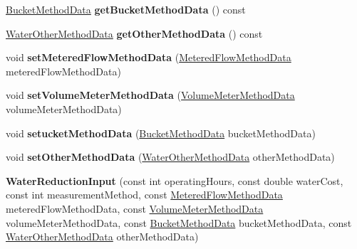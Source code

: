 \begin{DoxyCompactItemize}
\item 
\mbox{\label{class_water_reduction_input_ae327c2bd833db5da7251c605e27dd1d3}} 
\hyperlink{class_bucket_method_data}{Bucket\+Method\+Data} {\bfseries get\+Bucket\+Method\+Data} () const
\item 
\mbox{\label{class_water_reduction_input_ac18e59397bcb7aee57d7f9cc74bc5d07}} 
\hyperlink{class_water_other_method_data}{Water\+Other\+Method\+Data} {\bfseries get\+Other\+Method\+Data} () const
\item 
\mbox{\label{class_water_reduction_input_adb1fb8446cce129a6c99b298ccb8cc23}} 
void {\bfseries set\+Metered\+Flow\+Method\+Data} (\hyperlink{class_metered_flow_method_data}{Metered\+Flow\+Method\+Data} metered\+Flow\+Method\+Data)
\item 
\mbox{\label{class_water_reduction_input_a6cb184a7e87c8f6602fb4b23fe99d0d3}} 
void {\bfseries set\+Volume\+Meter\+Method\+Data} (\hyperlink{class_volume_meter_method_data}{Volume\+Meter\+Method\+Data} volume\+Meter\+Method\+Data)
\item 
\mbox{\label{class_water_reduction_input_a17a480f7b3f54a14c4dbbca956faba08}} 
void {\bfseries setucket\+Method\+Data} (\hyperlink{class_bucket_method_data}{Bucket\+Method\+Data} bucket\+Method\+Data)
\item 
\mbox{\label{class_water_reduction_input_aa5fdd9f96fdc7f92f657d3fa2157aa78}} 
void {\bfseries set\+Other\+Method\+Data} (\hyperlink{class_water_other_method_data}{Water\+Other\+Method\+Data} other\+Method\+Data)
\item 
\mbox{\label{class_water_reduction_input_a3dca4a54390c3138ffb370b6f2cb042a}} 
{\bfseries Water\+Reduction\+Input} (const int operating\+Hours, const double water\+Cost, const int measurement\+Method, const \hyperlink{class_metered_flow_method_data}{Metered\+Flow\+Method\+Data} metered\+Flow\+Method\+Data, const \hyperlink{class_volume_meter_method_data}{Volume\+Meter\+Method\+Data} volume\+Meter\+Method\+Data, const \hyperlink{class_bucket_method_data}{Bucket\+Method\+Data} bucket\+Method\+Data, const \hyperlink{class_water_other_method_data}{Water\+Other\+Method\+Data} other\+Method\+Data)

\end{DoxyCompactItemize}
